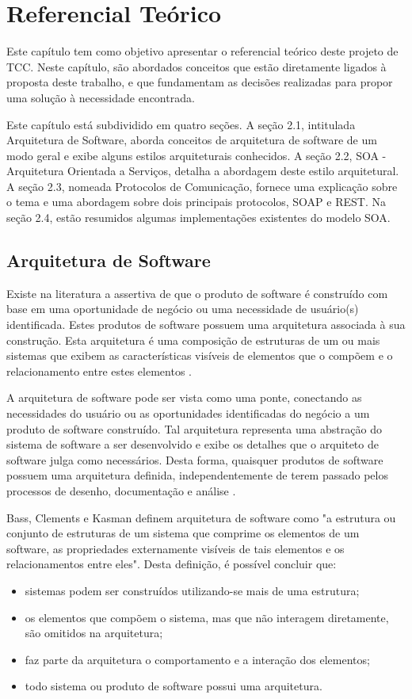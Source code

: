 \chapter[Referencial Teórico]{Referencial Teórico}

Este capítulo tem como objetivo apresentar o referencial teórico deste projeto de TCC. Neste capítulo, são abordados conceitos que estão diretamente ligados à proposta deste trabalho, e que fundamentam as decisões realizadas para propor uma solução à necessidade encontrada.

Este capítulo está subdividido em quatro seções. A seção 2.1, intitulada Arquitetura de Software, aborda conceitos de arquitetura de software de um modo geral e exibe alguns estilos arquiteturais conhecidos. A seção 2.2, SOA - Arquitetura Orientada a Serviços, detalha a abordagem deste estilo arquitetural. A seção 2.3, nomeada Protocolos de Comunicação, fornece uma explicação sobre o tema e uma abordagem sobre dois principais protocolos, SOAP e REST. Na seção 2.4, estão resumidos algumas implementações existentes do modelo SOA.

\section{Arquitetura de Software}
Existe na literatura a assertiva de que o produto de software é construído com base em uma oportunidade de negócio ou uma necessidade de usuário(s) identificada. Estes produtos de software possuem uma arquitetura associada à sua construção. Esta arquitetura é uma composição de estruturas de um ou mais sistemas que exibem as características visíveis de elementos que o compõem e o relacionamento entre estes elementos \cite{bass_software_archi_practice_2003}.

A arquitetura de software pode ser vista como uma ponte, conectando as necessidades do usuário ou as oportunidades identificadas do negócio a um produto de software construído. Tal arquitetura representa uma abstração do sistema de software a ser desenvolvido e exibe os detalhes que o arquiteto de software julga como necessários. Desta forma, quaisquer produtos de software possuem uma arquitetura definida, independentemente de terem passado pelos processos de desenho, documentação e análise \cite{bass_software_archi_practice_2003}.

Bass, Clements e Kasman \cite{bass_software_archi_practice_2003} definem arquitetura de software como "a estrutura ou conjunto de estruturas de um sistema que comprime os elementos de um software, as propriedades externamente visíveis de tais elementos e os relacionamentos entre eles". Desta definição, é possível concluir que:
\begin{itemize}
\item sistemas podem ser construídos utilizando-se mais de uma estrutura;
\item os elementos que compõem o sistema, mas que não interagem diretamente, são omitidos na arquitetura;
\item faz parte da arquitetura o comportamento e a interação dos elementos;
\item todo sistema ou produto de software possui uma arquitetura.
\end{itemize}

